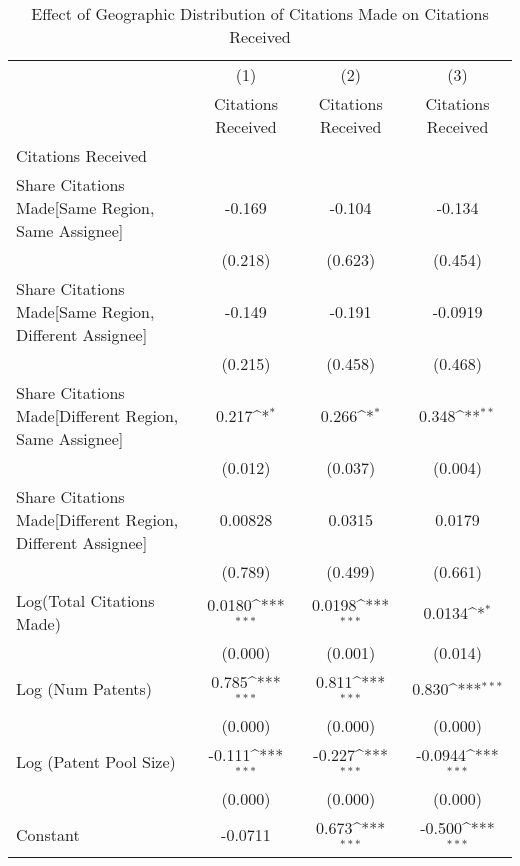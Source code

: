 {
\def\sym#1{\ifmmode^{#1}\else\(^{#1}\)\fi}
\begin{longtable}{l*{3}{c}}
\caption{Effect of Geographic Distribution of Citations Made on Citations Received \label{model123}}\\
\hline\hline\endfirsthead\hline\endhead\hline\endfoot\endlastfoot
                &\multicolumn{1}{c}{(1)}&\multicolumn{1}{c}{(2)}&\multicolumn{1}{c}{(3)}\\
                &\multicolumn{1}{c}{Citations Received}&\multicolumn{1}{c}{Citations Received}&\multicolumn{1}{c}{Citations Received}\\
\hline
Citations Received&                  &                  &                  \\
Share Citations Made[Same Region, Same Assignee]&   -0.169         &   -0.104         &   -0.134         \\
                &  (0.218)         &  (0.623)         &  (0.454)         \\
Share Citations Made[Same Region, Different Assignee]&   -0.149         &   -0.191         &  -0.0919         \\
                &  (0.215)         &  (0.458)         &  (0.468)         \\
Share Citations Made[Different Region, Same Assignee]&    0.217\sym{*}  &    0.266\sym{*}  &    0.348\sym{**} \\
                &  (0.012)         &  (0.037)         &  (0.004)         \\
Share Citations Made[Different Region, Different Assignee]&  0.00828         &   0.0315         &   0.0179         \\
                &  (0.789)         &  (0.499)         &  (0.661)         \\
Log(Total Citations Made)&   0.0180\sym{***}&   0.0198\sym{***}&   0.0134\sym{*}  \\
                &  (0.000)         &  (0.001)         &  (0.014)         \\
Log (Num Patents)&    0.785\sym{***}&    0.811\sym{***}&    0.830\sym{***}\\
                &  (0.000)         &  (0.000)         &  (0.000)         \\
Log (Patent Pool Size)&   -0.111\sym{***}&   -0.227\sym{***}&  -0.0944\sym{***}\\
                &  (0.000)         &  (0.000)         &  (0.000)         \\
Constant        &  -0.0711         &    0.673\sym{***}&   -0.500\sym{***}\\

\end{longtable}}
